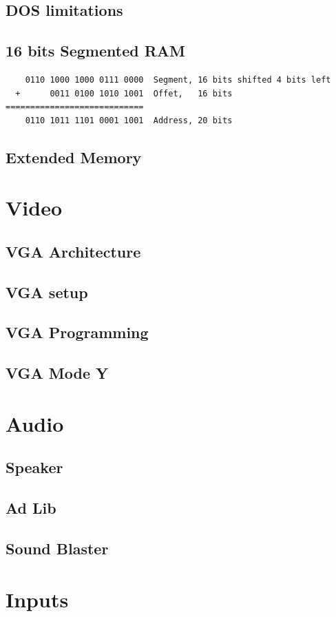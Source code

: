\documentclass[book.tex]{subfiles}
\begin{document}
  \subsection{DOS limitations}

  \subsection{16 bits Segmented RAM}

\begin{verbatim}
    0110 1000 1000 0111 0000  Segment, 16 bits shifted 4 bits left  
  +      0011 0100 1010 1001  Offet,   16 bits
============================
    0110 1011 1101 0001 1001  Address, 20 bits
\end{verbatim}

  \subsection{Extended Memory}
  
\section{Video}
  \subsection{VGA Architecture}
  \subsection{VGA setup}
  \subsection{VGA Programming}
  \subsection{VGA Mode Y}
\section{Audio}
  \subsection{Speaker}
  \subsection{Ad Lib}
  \subsection{Sound Blaster}

\section{Inputs}
\end{document}
